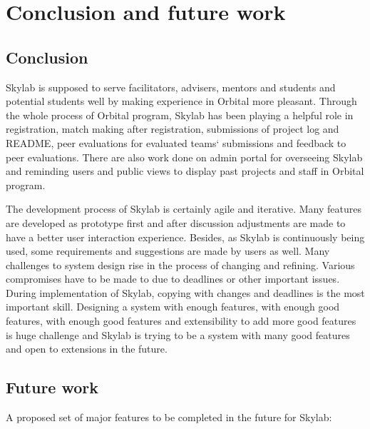\chapter{Conclusion and future work} \label{conclusionandfuturework}

\section{Conclusion}

Skylab is supposed to serve facilitators, advisers, mentors and students and potential students well by making experience in Orbital more pleasant. Through the whole process of Orbital program, Skylab has been playing a helpful role in registration, match making after registration, submissions of project log and README, peer evaluations for evaluated teams` submissions and feedback to peer evaluations. There are also work done on admin portal for overseeing Skylab and reminding users and public views to display past projects and staff in Orbital program.

The development process of Skylab is certainly agile and iterative. Many features are developed as prototype first and after discussion adjustments are made to have a better user interaction experience. Besides, as Skylab is continuously being used, some requirements and suggestions are made by users as well. Many challenges to system design rise in the process of changing and refining. Various compromises have to be made to due to deadlines or other important issues. During implementation of Skylab, copying with changes and deadlines is the most important skill. Designing a system with enough features, with enough good features, with enough good features and extensibility to add more good features is huge challenge and Skylab is trying to be a system with many good features and open to extensions in the future.

\section{Future work}

A proposed set of major features to be completed in the future for Skylab:


